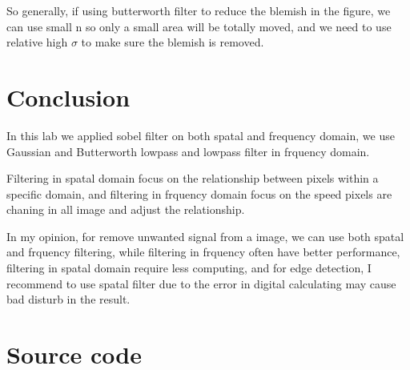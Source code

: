 \documentclass[
	12pt, %
]{style/fphw}
\begin{document}
So generally, if using butterworth filter to reduce the blemish in the figure, we can use small n so only a small area will be totally moved, and we need to use relative high $\sigma$ to make sure the blemish is removed.

\section*{Conclusion}

In this lab we applied sobel filter on both spatal and frequency domain, we use Gaussian and Butterworth lowpass and lowpass filter in frquency domain. 

Filtering in spatal domain focus on the relationship between pixels within a specific domain, and filtering in frquency domain focus on the speed pixels are chaning in all image and adjust the relationship. 

In my opinion, for remove unwanted signal from a image, we can use both spatal and frquency filtering, while filtering in frquency often have better performance, filtering in spatal domain require less computing, and for edge detection, I recommend to use spatal filter due to the error in digital calculating may cause bad disturb in the result.

\newpage
\section*{Source code}

\inputminted[linenos,breaklines, breakafter=d, bgcolor=bg]{python}{code/EE326_SUSTech.py}

\inputminted[linenos,breaklines, breakafter=d, bgcolor=bg]{python}{code/sobel_filter_11810818.py}

\inputminted[linenos,breaklines, breakafter=d, bgcolor=bg]{python}{code/gaussian_pass_11810818.py}

\inputminted[linenos,breaklines, breakafter=d, bgcolor=bg]{python}{code/butterworth_notch_filters_11810818.py}
\end{document}
